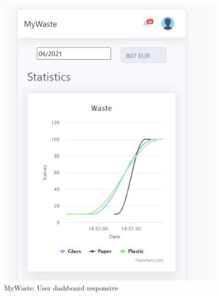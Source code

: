\documentclass{report}
\begin{document}
\begin{figure}[h!]
    \begin{center}
        \includegraphics[width=1.0\textwidth]{images/userDashboard_resp1.PNG}  \end{center}
    \caption{MyWaste: User dashboard responsive}
    \label{fig: respuserdash1}
\end{figure}
\end{document}
